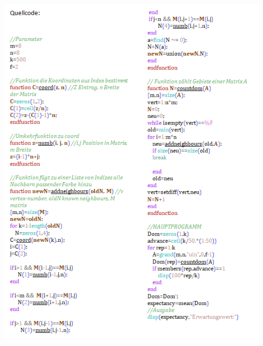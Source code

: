 \documentclass[11pt,a4paper]{article}
\numberwithin{equation}{section}
\numberwithin{table}{section}
\numberwithin{figure}{section}
\begin{document}
\clearpage
\begin{center}\includegraphics[scale=1.05]{9}
\end{center}
\clearpage
\end{document}
